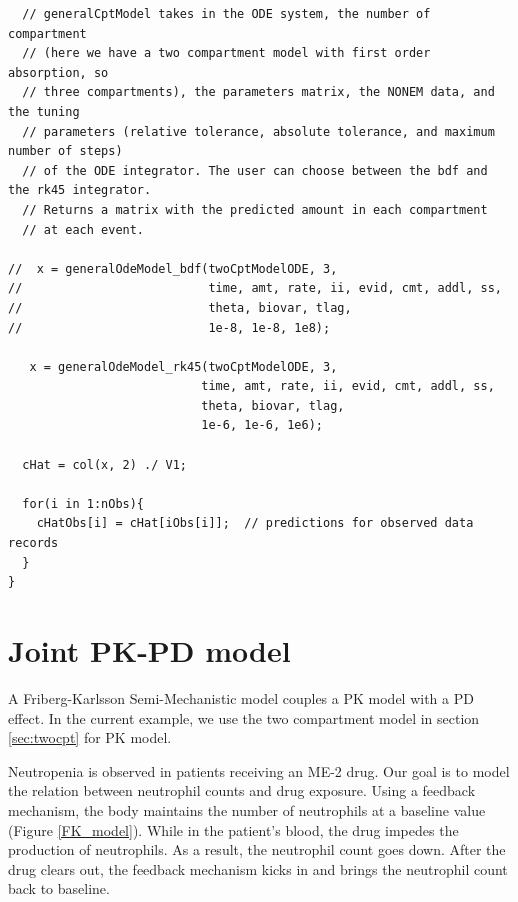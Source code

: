 \documentclass[11pt, reqno, oneside]{amsbook}
\numberwithin{equation}{chapter}
\numberwithin{figure}{chapter}
\numberwithin{table}{chapter}
\theoremstyle{remark}
\begin{document}
\begin{verbatim}
  // generalCptModel takes in the ODE system, the number of compartment 
  // (here we have a two compartment model with first order absorption, so
  // three compartments), the parameters matrix, the NONEM data, and the tuning
  // parameters (relative tolerance, absolute tolerance, and maximum number of steps)
  // of the ODE integrator. The user can choose between the bdf and the rk45 integrator.
  // Returns a matrix with the predicted amount in each compartment 
  // at each event.

//  x = generalOdeModel_bdf(twoCptModelODE, 3,
//                          time, amt, rate, ii, evid, cmt, addl, ss,
//                          theta, biovar, tlag,
//                          1e-8, 1e-8, 1e8);

   x = generalOdeModel_rk45(twoCptModelODE, 3,
                           time, amt, rate, ii, evid, cmt, addl, ss,
                           theta, biovar, tlag,
                           1e-6, 1e-6, 1e6);

  cHat = col(x, 2) ./ V1;

  for(i in 1:nObs){
    cHatObs[i] = cHat[iObs[i]];  // predictions for observed data records
  }
}
\end{verbatim}

\section{Joint PK-PD model}
\label{sec:orgd4d642e}

A Friberg-Karlsson Semi-Mechanistic model \cite{friberg_mechanistic_2003} couples
a PK model with a PD
effect. In the current example, we use the two compartment model in section \ref{sec:twocpt} for
PK model.

Neutropenia is observed in patients receiving an ME-2 drug. Our goal
is to model the relation between neutrophil counts and drug
exposure. Using a feedback mechanism, the body maintains the number of
neutrophils at a baseline value (Figure \ref{FK_model}). While in the
patient's blood, the drug impedes the production of neutrophils. As a
result, the neutrophil count goes down. After the drug clears out, the
feedback mechanism kicks in and brings the neutrophil count back to
baseline.
\end{document}
